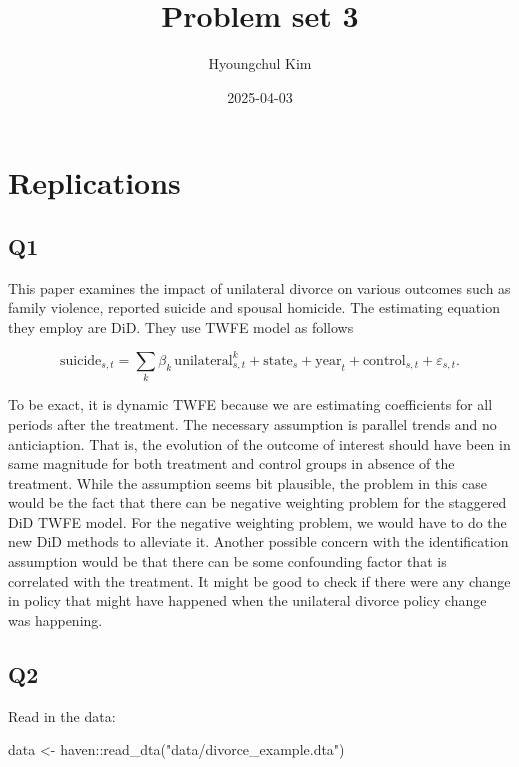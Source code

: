 \documentclass[
  letterpaper,
  DIV=11,
  numbers=noendperiod]{scrartcl}
\title{Problem set 3}
\author{Hyoungchul Kim}
\date{2025-04-03}
\newenvironment{Shaded}{\begin{snugshade}}{\end{snugshade}}
\newcommand{\FunctionTok}[1]{\textcolor[rgb]{0.28,0.35,0.67}{#1}}
\newcommand{\NormalTok}[1]{\textcolor[rgb]{0.00,0.23,0.31}{#1}}
\newcommand{\OtherTok}[1]{\textcolor[rgb]{0.00,0.23,0.31}{#1}}
\newcommand{\SpecialCharTok}[1]{\textcolor[rgb]{0.37,0.37,0.37}{#1}}
\newcommand{\StringTok}[1]{\textcolor[rgb]{0.13,0.47,0.30}{#1}}
\begin{document}
\maketitle


\section{Replications}\label{replications}

\subsection{Q1}\label{q1}

This paper examines the impact of unilateral divorce on various outcomes
such as family violence, reported suicide and spousal homicide. The
estimating equation they employ are DiD. They use TWFE model as follows

\[
\text{suicide}_{s,t} = \sum_k \beta_k \, \text{unilateral}_{s,t}^k + \text{state}_s + \text{year}_t + \text{control}_{s,t} + \varepsilon_{s,t}.
\]

To be exact, it is dynamic TWFE because we are estimating coefficients
for all periods after the treatment. The necessary assumption is
parallel trends and no anticiaption. That is, the evolution of the
outcome of interest should have been in same magnitude for both
treatment and control groups in absence of the treatment. While the
assumption seems bit plausible, the problem in this case would be the
fact that there can be negative weighting problem for the staggered DiD
TWFE model. For the negative weighting problem, we would have to do the
new DiD methods to alleviate it. Another possible concern with the
identification assumption would be that there can be some confounding
factor that is correlated with the treatment. It might be good to check
if there were any change in policy that might have happened when the
unilateral divorce policy change was happening.

\subsection{Q2}\label{q2}

Read in the data:

\begin{Shaded}
\begin{Highlighting}[]
\NormalTok{data }\OtherTok{\textless{}{-}}\NormalTok{ haven}\SpecialCharTok{::}\FunctionTok{read\_dta}\NormalTok{(}\StringTok{"data/divorce\_example.dta"}\NormalTok{)}
\end{Highlighting}
\end{Shaded}
\end{document}
